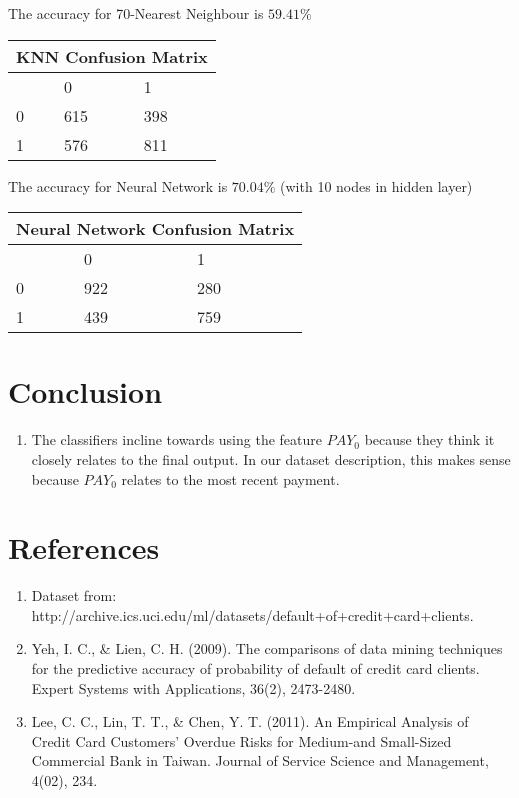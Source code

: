 \documentclass{article}
\begin{document}
The accuracy for 70-Nearest Neighbour is $59.41 \%$


\begin{center}
\begin{tabular}{ |p{3cm}|p{3cm}|p{3cm}|  }
\hline
\multicolumn{3}{|c|}{KNN Confusion Matrix } \\
 \hline
 & 0 & 1\\
 \hline
 0&615    &398\\
 1&576  & 811 \\
 
 \hline
\end{tabular}
\end{center}

The accuracy for Neural Network is $70.04 \%$ (with 10 nodes in hidden layer)

\begin{center}
\begin{tabular}{ |p{3cm}|p{3cm}|p{3cm}|  }
\hline
\multicolumn{3}{|c|}{Neural Network Confusion Matrix } \\
 \hline
 & 0 & 1\\
 \hline
 0&922    &280\\
 1&439  & 759 \\
 
 \hline
\end{tabular}
\end{center}

\section{Conclusion}
\begin{enumerate}

\item The classifiers incline towards using the feature $PAY_0$ because they think it closely relates to the final output. In our dataset description, this makes sense because $PAY_0$ relates to the most recent payment.

\end{enumerate}

\section{References}
\begin{enumerate}
\item Dataset from: http://archive.ics.uci.edu/ml/datasets/default+of+credit+card+clients.
\item Yeh, I. C., & Lien, C. H. (2009). The comparisons of data mining techniques for the predictive accuracy of probability of default of credit card clients. Expert Systems with Applications, 36(2), 2473-2480.
\item Lee, C. C., Lin, T. T., & Chen, Y. T. (2011). An Empirical Analysis of Credit Card Customers’ Overdue Risks for Medium-and Small-Sized Commercial Bank in Taiwan. Journal of Service Science and Management, 4(02), 234.
\end{enumerate}
\end{document}
